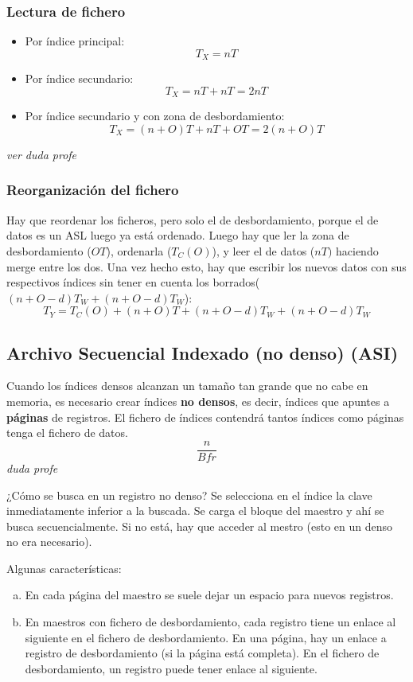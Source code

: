 \subsubsection{Lectura de fichero}
\begin{itemize}[(a)]
\item Por índice principal: 
\[
T_X=nT
\]
\item Por índice secundario:
\[
T_X=nT+nT=2nT
\]
\item Por índice secundario y con zona de desbordamiento:
\[
T_X=(n+O)T+nT+OT=2(n+O)T
\]
\end{itemize}
\textit{ver duda profe}
\subsubsection{Reorganización del fichero}

Hay que reordenar los ficheros, pero solo el de desbordamiento, porque el de datos es un ASL luego ya está ordenado. Luego hay que ler la zona de desbordamiento ($OT$), ordenarla ($T_C(O)$), y leer el de datos ($nT)$ haciendo merge entre los dos. Una vez hecho esto, hay que escribir los nuevos datos con sus respectivos índices sin tener en cuenta los borrados($(n+O-d)T_W+(n+O-d)T_W$):
\[
T_Y=T_C(O)+(n+O)T+(n+O-d)T_W+(n+O-d)T_W
\]

\subsection{Archivo Secuencial Indexado (no denso) (ASI)}

Cuando los índices densos alcanzan un tamaño tan grande que no cabe en memoria, es necesario crear índices \textbf{no densos}, es decir, índices que apuntes a \textbf{páginas} de registros. El fichero de índices contendrá tantos índices como páginas tenga el fichero de datos.
\[
\frac{n}{Bfr}
\]
\textit{duda profe}

¿Cómo se busca en un registro no denso? Se selecciona en el índice la clave inmediatamente inferior a la buscada. Se carga el bloque del maestro y ahí se busca secuencialmente. Si no está, hay que acceder al mestro (esto en un denso no era necesario).

Algunas características:
\begin{enumerate}[(a)]
\item En cada página del maestro se suele dejar un espacio para nuevos registros.
\item En maestros con fichero de desbordamiento, cada registro tiene un enlace al siguiente en el fichero de desbordamiento. En una página, hay un enlace a registro de desbordamiento (si la página está completa). En el fichero de desbordamiento, un registro puede tener enlace al siguiente.
\end{enumerate}

